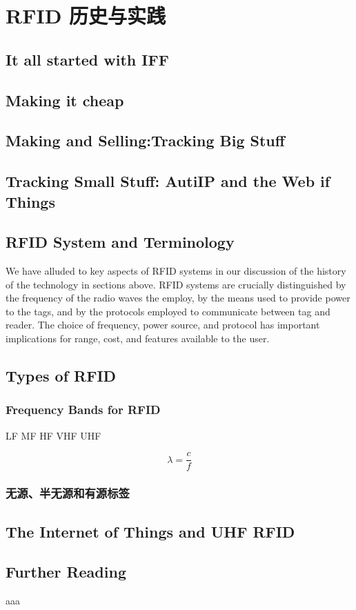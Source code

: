 \chapter{RFID 历史与实践}

\section{It all started with IFF}

\section{Making it cheap}

\section{Making and Selling:Tracking Big Stuff}

\section{Tracking Small Stuff: AutiIP and the Web if Things}

\section{RFID System and Terminology}

We have alluded to key aspects of RFID systems in our discussion of the history of the technology in sections above. RFID systems are crucially distinguished by the frequency of the radio waves the employ, by the means used to provide power to the tags, and by the protocols employed to communicate between tag and reader. The choice of frequency, power source, and protocol has important implications for range, cost, and features available to the user.

\section{Types of RFID}

\subsection{Frequency Bands for RFID}

LF
MF
HF
VHF
UHF

\begin{equation}
    \lambda = \frac{c}{f}
\end{equation}

\subsection{无源、半无源和有源标签}

\section{The Internet of Things and UHF RFID}




\section*{Further Reading}


\begin{problemset}
    \item aaa
    \item 
\end{problemset}